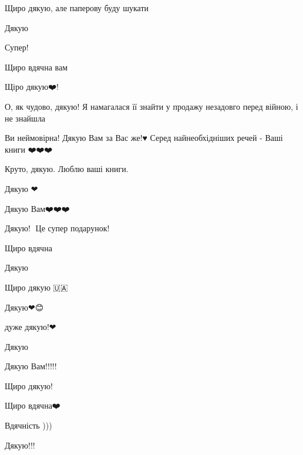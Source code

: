 Щиро дякую, але паперову буду шукати🙏💙💛


Дякую 🤗💜


Супер!


Щиро вдячна вам


Щіро дякую❤️!


О, як чудово, дякую! Я намагалася її знайти у продажу незадовго перед війною, і не знайшла


Ви неймовірна! Дякую Вам за Вас же!♥️ Серед найнеобхідніших речей - Ваші книги ❤️❤️❤️


Круто, дякую. Люблю ваші книги.


Дякую ❤


Дякую Вам❤️❤️❤️


Дякую!🎁 Це супер подарунок! 💙💛🇺🇦


Щиро вдячна🙏


Дякую 💙💛


Щиро дякую 🇺🇦


Дякую❤😊


дуже дякую!❤🌼


Дякую💛


Дякую Вам!!!!!


Щиро дякую!

Щиро вдячна❤️

Вдячність )))

Дякую!!!

